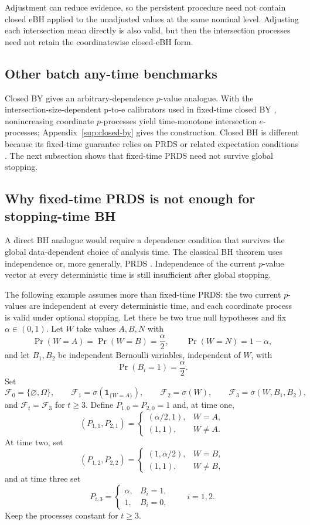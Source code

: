 \documentclass[11pt]{article}
\numberwithin{equation}{section}
\theoremstyle{plain}
\theoremstyle{definition}
\newcommand{\F}{\mathcal F}
\newcommand{\one}{\mathbf 1}
\begin{document}
Adjustment can reduce evidence, so the persistent procedure need not contain closed eBH applied to the unadjusted values at the same nominal level. Adjusting each intersection mean directly is also valid, but then the intersection processes need not retain the coordinatewise closed-eBH form.

\subsection{Other batch any-time benchmarks}\label{sec:closed-by}

Closed BY gives an arbitrary-dependence $p$-value analogue. With the intersection-size-dependent p-to-e calibrators used in fixed-time closed BY \citep{BenjaminiYekutieli2001,XuEtAl2026Closure}, nonincreasing coordinate $p$-processes yield time-monotone intersection $e$-processes; Appendix~\ref{sup:closed-by} gives the construction. Closed BH is different because its fixed-time guarantee relies on PRDS or related expectation conditions \citep{Goeman2026ClosedBH}. The next subsection shows that fixed-time PRDS need not survive global stopping.

\subsection{Why fixed-time PRDS is not enough for stopping-time BH}
\label{sec:why-not-bh}

A direct BH analogue would require a dependence condition that survives the global data-dependent choice of analysis time. The classical BH theorem uses independence or, more generally, PRDS \citep{BenjaminiHochberg1995,BenjaminiYekutieli2001}. Independence of the current $p$-value vector at every deterministic time is still insufficient after global stopping.

The following example assumes more than fixed-time PRDS: the two current $p$-values are independent at every deterministic time, and each coordinate process is valid under optional stopping. Let there be two true null hypotheses and fix $\alpha\in(0,1)$. Let $W$ take values $A,B,N$ with
\[
\Pr(W=A)=\Pr(W=B)=\frac{\alpha}{2},
\qquad
\Pr(W=N)=1-\alpha,
\]
and let $B_1,B_2$ be independent Bernoulli variables, independent of $W$, with
\[
\Pr(B_i=1)=\frac{\alpha}{2}.
\]
Set
\[
\F_0=\{\varnothing,\Omega\},\qquad
\F_1=\sigma(\one_{\{W=A\}}),\qquad
\F_2=\sigma(W),\qquad
\F_3=\sigma(W,B_1,B_2),
\]
and $\F_t=\F_3$ for $t\geq3$. Define $P_{1,0}=P_{2,0}=1$ and, at time one,
\[
(P_{1,1},P_{2,1})
=
\begin{cases}
	(\alpha/2,1),&W=A,\\
	(1,1),&W\neq A.
\end{cases}
\]
At time two, set
\[
(P_{1,2},P_{2,2})
=
\begin{cases}
	(1,\alpha/2),&W=B,\\
	(1,1),&W\neq B,
\end{cases}
\]
and at time three set
\[
P_{i,3}
=
\begin{cases}
	\alpha,&B_i=1,\\
	1,&B_i=0,
\end{cases}
\qquad i=1,2.
\]
Keep the processes constant for $t\geq3$.
\end{document}
